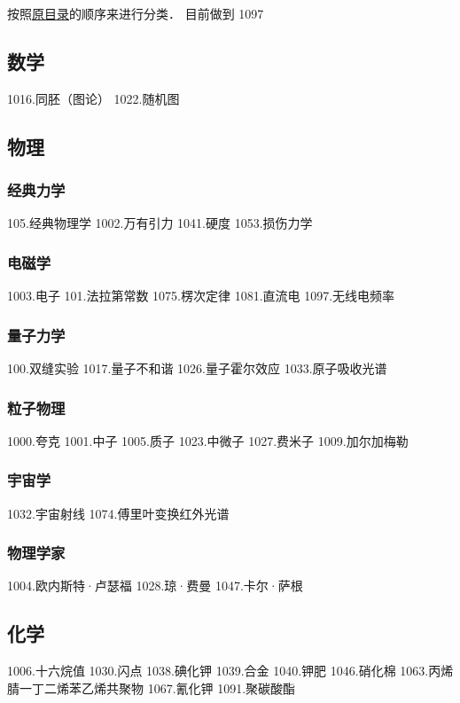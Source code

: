 
\begin{issues}
\issueDraft
\end{issues}

按照\href{https://wuli.wiki/assets/sogou}{原目录}的顺序来进行分类． 目前做到 1097

\subsection{数学}

1016.同胚（图论）
1022.随机图

\subsection{物理}
\subsubsection{经典力学}
105.经典物理学
1002.万有引力
1041.硬度
1053.损伤力学
\subsubsection{电磁学}
1003.电子
101.法拉第常数
1075.楞次定律
1081.直流电
1097.无线电频率
\subsubsection{量子力学}
100.双缝实验
1017.量子不和谐
1026.量子霍尔效应
1033.原子吸收光谱
\subsubsection{粒子物理}
1000.夸克
1001.中子
1005.质子
1023.中微子
1027.费米子
1009.加尔加梅勒
\subsubsection{宇宙学}
1032.宇宙射线
1074.傅里叶变换红外光谱
\subsubsection{物理学家}
1004.欧内斯特·卢瑟福
1028.琼·费曼
1047.卡尔·萨根

\subsection{化学}
1006.十六烷值
1030.闪点
1038.碘化钾
1039.合金
1040.钾肥
1046.硝化棉
1063.丙烯腈一丁二烯苯乙烯共聚物
1067.氰化钾
1091.聚碳酸酯


